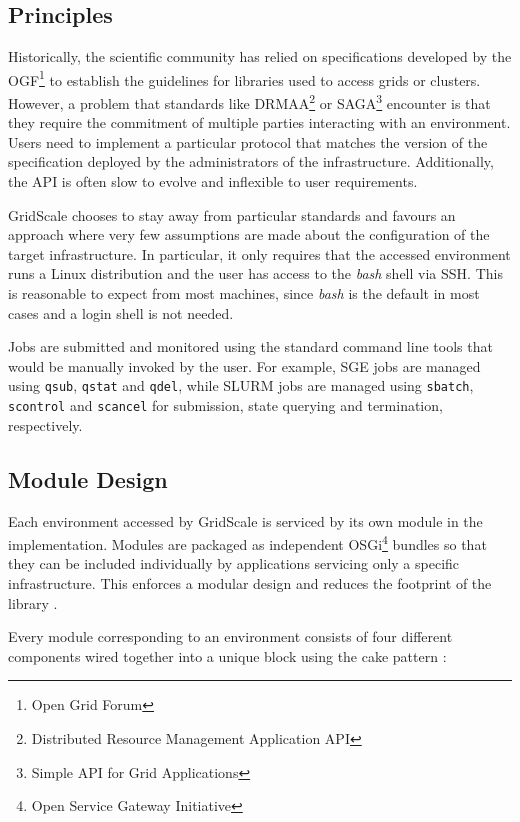 \subsection{Principles}

Historically, the scientific community has relied on specifications developed by the OGF\footnote{Open Grid Forum} \cite{OGF} to establish the guidelines for libraries used to access grids or clusters. However, a problem that standards like DRMAA\footnote{Distributed Resource Management Application API} \cite{DRMAA} or SAGA\footnote{Simple API for Grid Applications} \cite{SAGA} encounter is that they require the commitment of multiple parties interacting with an environment. Users need to implement a particular protocol that matches the version of the specification deployed by the administrators of the infrastructure. Additionally, the API is often slow to evolve and inflexible to user requirements.

GridScale chooses to stay away from particular standards and favours an approach where very few assumptions are made about the configuration of the target infrastructure. In particular, it only requires that the accessed environment runs a Linux distribution and the user has access to the \textit{bash} shell via SSH. This is reasonable to expect from most machines, since \textit{bash} is the default in most cases and a login shell is not needed. 

Jobs are submitted and monitored using the standard command line tools that would be manually invoked by the user. For example, SGE jobs are managed using \verb|qsub|, \verb|qstat| and \verb|qdel|, while SLURM jobs are managed using \verb|sbatch|, \verb|scontrol| and \verb|scancel| for submission, state querying and termination, respectively.

\subsection{Module Design}

Each environment accessed by GridScale is serviced by its own module in the implementation. Modules are packaged as independent OSGi\footnote{Open Service Gateway Initiative} \cite{OSGi} bundles so that they can be included individually by applications servicing only a specific infrastructure. This enforces a modular design and reduces the footprint of the library \cite{Reuillon2016}.

Every module corresponding to an environment consists of four different components wired together into a unique block using the cake pattern \cite{Cake}:


